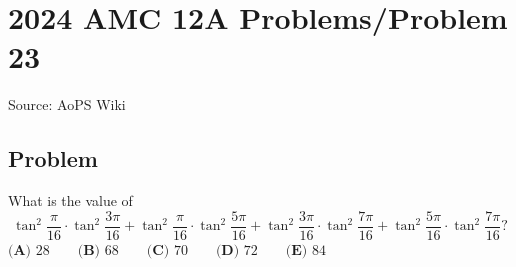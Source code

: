 \documentclass[12pt]{article}
\begin{document}
\section*{{2024 AMC 12A Problems/Problem 23}}
Source: AoPS Wiki

\subsection*{Problem}
What is the value of \[\tan^2 \frac {\pi}{16} \cdot \tan^2 \frac {3\pi}{16} + \tan^2 \frac {\pi}{16} \cdot \tan^2 \frac {5\pi}{16}+\tan^2 \frac {3\pi}{16} \cdot \tan^2 \frac {7\pi}{16}+\tan^2 \frac {5\pi}{16} \cdot \tan^2 \frac {7\pi}{16}?\] $\textbf{(A) } 28 \qquad \textbf{(B) } 68 \qquad \textbf{(C) } 70 \qquad \textbf{(D) } 72 \qquad \textbf{(E) } 84$
\end{document}
